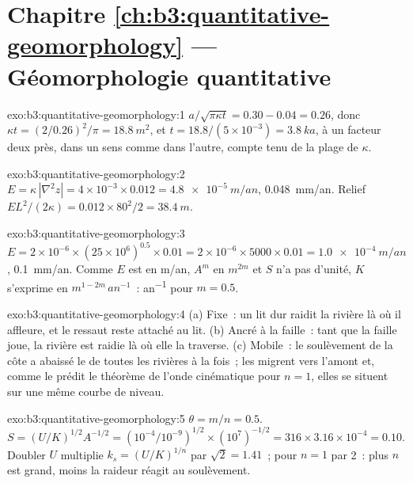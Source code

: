\section*{Chapitre \ref{ch:b3:quantitative-geomorphology} --- Géomorphologie quantitative}

\begin{solution}{exo:b3:quantitative-geomorphology:1}
$a/\sqrt{\pi\kappa t} = 0.30 - 0.04 = 0.26$, donc $\kappa t = (2/0.26)^2/\pi =
\qty{18.8}{m^2}$, et $t = 18.8/(5\times10^{-3}) = \qty{3.8}{ka}$, à un facteur
deux près, dans un sens comme dans l'autre, compte tenu de la plage de $\kappa$.
\end{solution}

\begin{solution}{exo:b3:quantitative-geomorphology:2}
$E = \kappa\,|\nabla^2 z| = 4\times10^{-3}\times0.012 =
\qty{4.8e-5}{m/an}$, \qty{0.048}{mm/an}. Relief $E L^2/(2\kappa) =
0.012\times80^2/2 = \qty{38.4}{m}$.
\end{solution}

\begin{solution}{exo:b3:quantitative-geomorphology:3}
$E = 2\times10^{-6}\times(25\times10^6)^{0.5}\times0.01 = 2\times10^{-6}
\times5000\times0.01 = \qty{1.0e-4}{m/an}$, \qty{0.1}{mm/an}. Comme $E$ est
en \unit{m/an}, $A^m$ en $\unit{m}^{2m}$ et $S$ n'a pas d'unité, $K$ s'exprime en
$\unit{m}^{1-2m}\,\unit{an^{-1}}$~: \unit{an^{-1}} pour $m = 0.5$.
\end{solution}

\begin{solution}{exo:b3:quantitative-geomorphology:4}
(a) Fixe~: un lit dur raidit la rivière là où il affleure, et le ressaut
reste attaché au lit. (b) Ancré à la faille~: tant que la faille joue,
la rivière est raidie là où elle la traverse. (c) Mobile~: le soulèvement de la
côte a abaissé le  de toutes les rivières à la fois~; les 
migrent vers l'amont et, comme le prédit le théorème de l'onde cinématique pour $n
= 1$, elles se situent sur une même courbe de niveau.
\end{solution}

\begin{solution}{exo:b3:quantitative-geomorphology:5}
$\theta = m/n = 0.5$. $S = (U/K)^{1/2}A^{-1/2} = (10^{-4}/10^{-9})^{1/2}
\times(10^7)^{-1/2} = 316\times3.16\times10^{-4} = 0.10$. Doubler $U$
multiplie $k_s = (U/K)^{1/n}$ par $\sqrt2 = 1.41$~; pour $n = 1$ par 2~: plus
$n$ est grand, moins la raideur réagit au soulèvement.
\end{solution}

